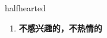 
\begin{frame}
{\huge halfhearted}
\begin{center}
\begin{enumerate}\Large
  \item \textbf{不感兴趣的，不热情的}
\end{enumerate}
\end{center}
\end{frame}
